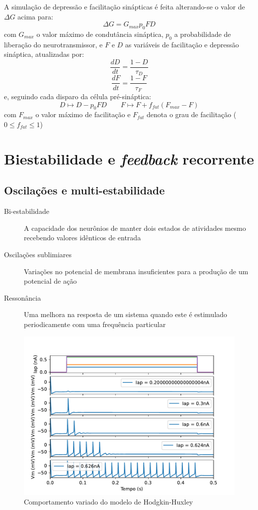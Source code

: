 A simulação de depressão e facilitação sinápticas é feita alterando-se o valor de $\Delta G$ acima para:
$$
\Delta G=G_{max}p_0FD
$$
com $G_{max}$ o valor máximo de condutância sináptica, $p_0$ a probabilidade de liberação do neurotransmissor, e $F$ e $D$ as variáveis de facilitação e depressão sináptica, atualizadas por:
$$
\frac{dD}{dt}=\frac{1-D}{\tau_D}
$$$$
\frac{dF}{dt}=\frac{1-F}{\tau_F}
$$
e, seguindo cada disparo da célula pré-sináptica:
$$
D\mapsto D-p_0FD\qquad F\mapsto F+f_{fat}(F_{max}-F)
$$
com $F_{max}$ o valor máximo de facilitação e $F_{fat}$ denota o grau de facilitação ($0\leq f_{fat}\leq 1$)


\section{Biestabilidade e \textit{feedback} recorrente}\label{sec:biestabilidade}

\subsection{Oscilações e multi-estabilidade}
\begin{description}
	\item[Bi-estabilidade] A capacidade dos neurônios de manter dois estados de atividades mesmo recebendo valores idênticos de entrada
	\item[Oscilações sublimiares] Variações no potencial de membrana insuficientes para a produção de um potencial de ação
	\item[Ressonância] Uma melhora na resposta de um sistema quando este é estimulado periodicamente com uma frequência particular
\end{description}

\begin{figure}[htb!]
	\centering
	\caption{Comportamento variado do modelo de Hodgkin-Huxley}
	\label{fig:hhdinamico}
	\includegraphics[width=0.7\linewidth]{figs/hh_dinamico}
\end{figure}


